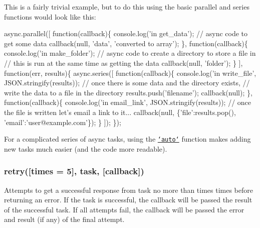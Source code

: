 This is a fairly trivial example, but to do this using the basic parallel and series functions would look like this\+:


\begin{DoxyCode}
async.parallel([
    \textcolor{keyword}{function}(callback)\{
        console.log(\textcolor{stringliteral}{'in get\_data'});
        \textcolor{comment}{// async code to get some data}
        callback(null, \textcolor{stringliteral}{'data'}, \textcolor{stringliteral}{'converted to array'});
    \},
    \textcolor{keyword}{function}(callback)\{
        console.log(\textcolor{stringliteral}{'in make\_folder'});
        \textcolor{comment}{// async code to create a directory to store a file in}
        \textcolor{comment}{// this is run at the same time as getting the data}
        callback(null, \textcolor{stringliteral}{'folder'});
    \}
],
\textcolor{keyword}{function}(err, results)\{
    async.series([
        \textcolor{keyword}{function}(callback)\{
            console.log(\textcolor{stringliteral}{'in write\_file'}, JSON.stringify(results));
            \textcolor{comment}{// once there is some data and the directory exists,}
            \textcolor{comment}{// write the data to a file in the directory}
            results.push(\textcolor{stringliteral}{'filename'});
            callback(null);
        \},
        \textcolor{keyword}{function}(callback)\{
            console.log(\textcolor{stringliteral}{'in email\_link'}, JSON.stringify(results));
            \textcolor{comment}{// once the file is written let's email a link to it...}
            callback(null, \{\textcolor{stringliteral}{'file'}:results.pop(), \textcolor{stringliteral}{'email'}:\textcolor{stringliteral}{'user@example.com'}\});
        \}
    ]);
\});
\end{DoxyCode}


For a complicated series of {\ttfamily async} tasks, using the \href{#auto}{\tt `auto`} function makes adding new tasks much easier (and the code more readable).





\label{_retry}%
 \subsubsection*{retry(\mbox{[}times = 5\mbox{]}, task, \mbox{[}callback\mbox{]})}

Attempts to get a successful response from {\ttfamily task} no more than {\ttfamily times} times before returning an error. If the task is successful, the {\ttfamily callback} will be passed the result of the successful task. If all attempts fail, the callback will be passed the error and result (if any) of the final attempt.

